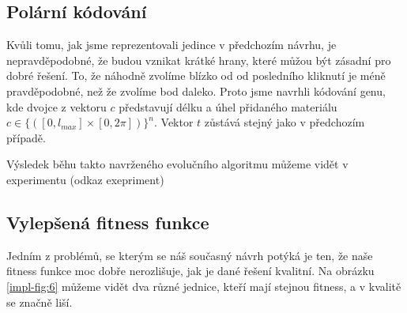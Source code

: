 \subsection{Polární kódování}

Kvůli tomu, jak jsme reprezentovali jedince v předchozím návrhu, je nepravděpodobné, že budou vznikat krátké hrany, které můžou být zásadní pro dobré řešení. To, že náhodně zvolíme blízko od od posledního kliknutí je méně pravděpodobné, než že zvolíme bod daleko. Proto jsme navrhli kódování genu, kde dvojce z vektoru $c$ představují délku a úhel přidaného materiálu $c \in \{([0, l_{max}] \times [0, 2 \pi])\}^n$. Vektor $t$ zůstává stejný jako v předchozím případě.

Výsledek běhu takto navrženého evolučního algoritmu můžeme vidět v experimentu (odkaz exepriment)

\subsection{Vylepšená fitness funkce}

Jedním z problémů, se kterým se náš současný návrh potýká je ten, že naše fitness funkce moc dobře nerozlišuje, jak je dané řešení kvalitní. Na obrázku \ref{impl-fig:6} můžeme vidět dva různé jednice, kteří mají stejnou fitness, a v kvalitě se značně liší.


